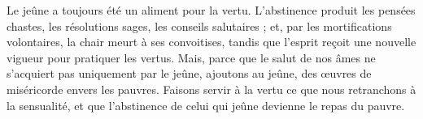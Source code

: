 Le jeûne a toujours été un aliment pour la vertu. L’abstinence produit les pensées chastes, les résolutions sages, les conseils salutaires ; et, par les mortifications volontaires, la chair meurt à ses convoitises, tandis que l’esprit reçoit une nouvelle vigueur pour pratiquer les vertus. Mais, parce que le salut de nos âmes ne s’acquiert pas uniquement par le jeûne, ajoutons au jeûne, des œuvres de miséricorde envers les pauvres. Faisons servir à la vertu ce que nous retranchons à la sensualité, et que l’abstinence de celui qui jeûne devienne le repas du pauvre.